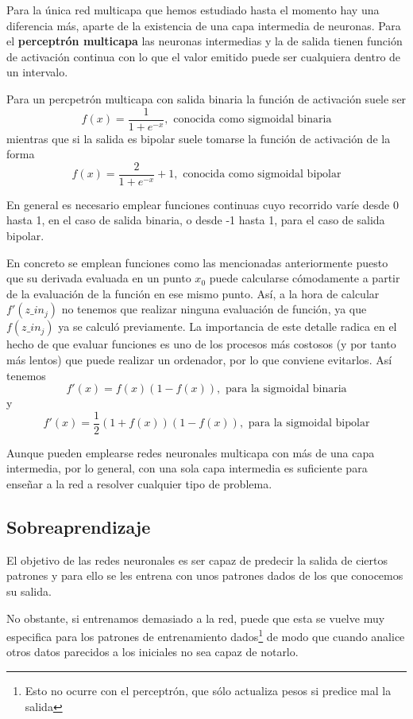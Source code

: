 Para la única red multicapa que hemos estudiado hasta el momento hay una diferencia más, aparte de la existencia de una capa intermedia de neuronas. Para el \textbf{perceptrón multicapa} las neuronas intermedias y la de salida tienen función de activación continua con lo que el valor emitido puede ser cualquiera dentro de un intervalo.

Para un percpetrón multicapa con salida binaria la función de activación suele ser
\[f(x) = \frac{1}{1+e^{-x}}, \text{ conocida como sigmoidal binaria}\]
mientras que si la salida es bipolar suele tomarse la función de activación de la forma
\[f(x) = \frac{2}{1+e^{-x}}+1, \text{ conocida como sigmoidal bipolar}\]

En general es necesario emplear funciones continuas cuyo recorrido varíe desde 0 hasta 1, en el caso de salida binaria, o desde -1 hasta 1, para el caso de salida bipolar.

En concreto se emplean funciones como las mencionadas anteriormente puesto que su derivada evaluada en un punto $x_0$ puede calcularse cómodamente a partir de la evaluación de la función en ese mismo punto. Así, a la hora de calcular $f'(z\_in_j)$ no tenemos que realizar ninguna evaluación de función, ya que $f(z\_in_j)$ ya se calculó previamente. La importancia de este detalle radica en el hecho de que evaluar funciones es uno de los procesos más costosos (y por tanto más lentos) que puede realizar un ordenador, por lo que conviene evitarlos. Así tenemos
\[f'(x) = f(x) (1-f(x)), \text{ para la sigmoidal binaria}\]
y
\[f'(x) = \frac{1}{2}(1+f(x))(1-f(x)), \text{ para la sigmoidal bipolar}\]

Aunque pueden emplearse redes neuronales multicapa con más de una capa intermedia, por lo general, con una sola capa intermedia es suficiente para enseñar a la red a resolver cualquier tipo de problema.

\subsection{Sobreaprendizaje}

El objetivo de las redes neuronales es ser capaz de predecir la salida de ciertos patrones y para ello se les entrena con unos patrones dados de los que conocemos su salida.

No obstante, si entrenamos demasiado a la red, puede que esta se vuelve muy especifica para los patrones de entrenamiento dados\footnote{Esto no ocurre con el perceptrón, que sólo actualiza pesos si predice mal la salida} de modo que cuando analice otros datos parecidos a los iniciales no sea capaz de notarlo.

